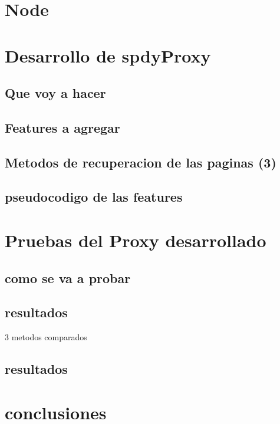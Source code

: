 \chapter{Node}
\chapter{Desarrollo de spdyProxy}
\section{Que voy a hacer}
\section{Features a agregar}
\section{Metodos de recuperacion de las paginas (3)}
\section{pseudocodigo de las features}

\chapter{Pruebas del Proxy desarrollado}
\section{como se va a probar}
\section{resultados}



3 metodos comparados
\section{resultados}

\chapter{conclusiones}